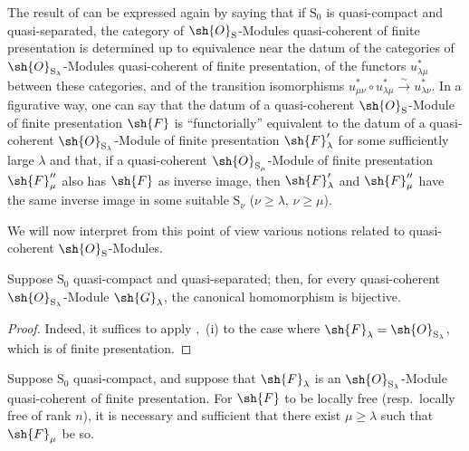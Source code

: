 \begin{env}[8.5.3]
\label{IV.8.5.3}
The result of  can be expressed again by saying that if $\mathrm{S}_0$ is quasi-compact and quasi-separated, the category of $\sh{O}_\mathrm{S}$-Modules quasi-coherent of finite presentation is determined up to equivalence near the datum of the categories of $\sh{O}_{\mathrm{S}_\lambda}$-Modules quasi-coherent of finite presentation, of the functors $u_{\lambda\mu}^*$ between these categories, and of the transition isomorphisms $u_{\mu\nu}^*\circ u_{\lambda\mu}^*\xrightarrow{\sim}u_{\lambda\nu}^*$.
In a figurative way, one can say that the datum of a quasi-coherent $\sh{O}_\mathrm{S}$-Module of finite presentation $\sh{F}$ is ``functorially'' equivalent to the datum of a quasi-coherent $\sh{O}_{\mathrm{S}_\lambda}$-Module of finite presentation $\sh{F}'_\lambda$ for some sufficiently large $\lambda$ and that, if a quasi-coherent $\sh{O}_{\mathrm{S}_\mu}$-Module of finite presentation $\sh{F}''_\mu$ also has $\sh{F}$ as inverse image, then $\sh{F}'_\lambda$ and $\sh{F}''_\mu$ have the same inverse image in some suitable $\mathrm{S}_\nu$ ($\nu\geqslant\lambda$, $\nu\geqslant\mu$).

We will now interpret from this point of view various notions related to quasi-coherent $\sh{O}_\mathrm{S}$-Modules.
\end{env}

\begin{corollary}[8.5.4]
\label{IV.8.5.4}
Suppose $\mathrm{S}_0$ quasi-compact and quasi-separated; then, for every quasi-coherent $\sh{O}_{\mathrm{S}_\lambda}$-Module $\sh{G}_\lambda$, the canonical homomorphism  is bijective.
\end{corollary}

\begin{proof}
Indeed, it suffices to apply ,~(i) to the case where $\sh{F}_\lambda=\sh{O}_{\mathrm{S}_\lambda}$, which is of finite presentation.
\end{proof}

\begin{proposition}[8.5.5]
\label{IV.8.5.5}
Suppose $\mathrm{S}_0$ quasi-compact, and suppose that $\sh{F}_\lambda$ is an $\sh{O}_{\mathrm{S}_\lambda}$-Module quasi-coherent of finite presentation.
For $\sh{F}$ to be locally free (resp.\ locally free of rank $n$), it is necessary and sufficient that there exist $\mu\geqslant\lambda$ such that $\sh{F}_\mu$ be so.
\end{proposition}


